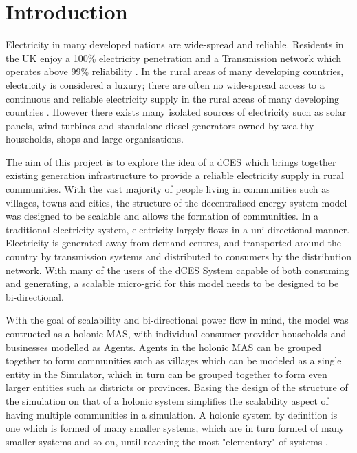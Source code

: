 \chapter{Introduction}
\label{introduction}

Electricity in many developed nations are wide-spread and reliable. Residents in the UK enjoy a 100\% electricity penetration\cite{World-Bank-web:2015} and a Transmission network which operates above 99\% reliability \cite{NG-web:2015}. In the rural areas of many developing countries, electricity is considered a luxury; there are often no wide-spread access to a continuous and reliable electricity supply in the rural areas of many developing countries \cite{IEA-web:2015}. However there exists many isolated sources of electricity such as solar panels, wind turbines and standalone diesel generators owned by wealthy households, shops and large organisations. 

The aim of this project is to explore the idea of a \ac{dCES} which brings together existing generation infrastructure to provide a reliable electricity supply in rural communities. With the vast majority of people living in communities such as villages, towns and cities, the structure of the decentralised energy system model was designed to be scalable and allows the formation of communities. In a traditional electricity system, electricity largely flows in a uni-directional manner. Electricity is generated away from demand centres, and transported around the country by transmission systems and distributed to consumers by the distribution network. With many of the users of the dCES System capable of both consuming and generating, a scalable micro-grid for this model needs to be designed to be bi-directional.

With the goal of scalability and bi-directional power flow in mind, the model was contructed as a holonic \ac{MAS}, with individual consumer-provider households and businesses modelled as Agents. Agents in the holonic MAS can be grouped together to form communities such as villages which can be modeled as a single entity in the Simulator, which in turn can be grouped together to form even larger entities such as districts or provinces. Basing the design of the structure of the simulation on that of a holonic system simplifies the scalability aspect of having multiple communities in a simulation. A holonic system by definition is one which is formed of many smaller systems, which are in turn formed of many smaller systems and so on, until reaching the most "elementary" of systems \cite{Pitt:Holonic_Institutions}. 

